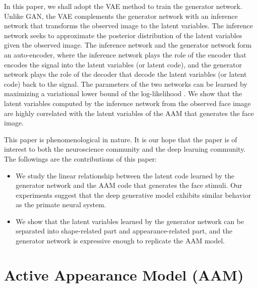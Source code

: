 \documentclass{article}
\begin{document}
In this paper, we shall adopt the VAE method to train the generator network. Unlike GAN, the VAE complements the generator network with an inference network that transforms the observed image to the latent variables. The inference network seeks to approximate the posterior distribution of the latent variables given the observed image. The inference network and the generator network form an auto-encoder, where the inference network plays the role of the encoder that encodes the signal into the latent variables (or latent code), and the generator network plays the role of the decoder that decode the latent variables (or latent code) back to the signal. The parameters of the two networks can be learned by maximizing a variational lower bound of the log-likelihood \cite{blei2017variational}. We show that the latent variables computed by the inference network from the observed face image are highly correlated with the latent variables of the AAM that generates the face image. 


 This paper is phenomenological in nature. It is our hope that the paper is of interest to both the neuroscience community and the deep learning community.  The followings are the contributions of this paper:
\begin{itemize}
\item We study the linear relationship between the latent code learned by the generator network and the AAM code that generates the face stimuli. Our experiments suggest that the deep generative model exhibits similar behavior as the primate neural system. 
\item We show that the latent variables learned by the generator network can be separated into shape-related part and appearance-related part, and the generator network is expressive enough to replicate the AAM model. 
\end{itemize}

\section{Active Appearance Model (AAM)}\label{sec:AAM} %
\end{document}
